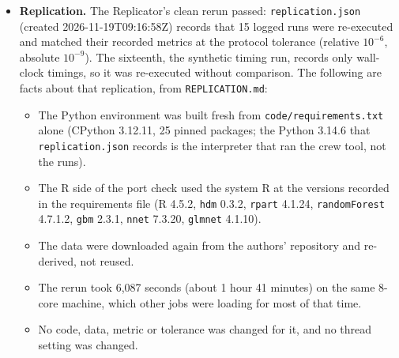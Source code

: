 \begin{itemize}
        archived briefs and the source notes.
  \item \textbf{Replication.} The Replicator's clean rerun passed:
        \texttt{replication.json} (created 2026-11-19T09:16:58Z) records that 15 logged
        runs were re-executed and matched their recorded metrics at the protocol tolerance
        (relative $10^{-6}$, absolute $10^{-9}$). The sixteenth, the synthetic timing run,
        records only wall-clock timings, so it was re-executed without comparison. The following are facts about that
        replication, from \texttt{REPLICATION.md}:
        \begin{itemize}
          \item The Python environment was built fresh from \texttt{code/requirements.txt}
                alone (CPython 3.12.11, 25 pinned packages; the Python 3.14.6 that
                \texttt{replication.json} records is the interpreter that ran the crew
                tool, not the runs).
          \item The R side of the port check used the system R at the versions recorded
                in the requirements file (R 4.5.2, \texttt{hdm} 0.3.2, \texttt{rpart}
                4.1.24, \texttt{randomForest} 4.7.1.2, \texttt{gbm} 2.3.1, \texttt{nnet}
                7.3.20, \texttt{glmnet} 4.1.10).
          \item The data were downloaded again from the authors' repository and re-derived,
                not reused.
          \item The rerun took 6,087 seconds (about 1 hour 41 minutes) on the same
                8-core machine, which other jobs were loading for most of that time.
          \item No code, data, metric or tolerance was changed for it, and no thread
                setting was changed.
        \end{itemize}
\end{itemize}
